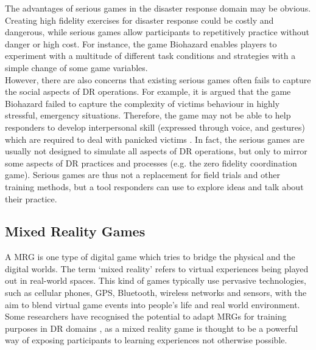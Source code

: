 The advantages of serious games in the disaster response domain may be obvious. Creating high fidelity exercises for disaster response could be costly and dangerous, while serious games allow participants to repetitively practice without danger or high cost. For instance, the game Biohazard \citep{Susi2007} enables players to experiment with a multitude of different task conditions and strategies with a simple change of some game variables.\\

However, there are also concerns that existing serious games often fails to capture the social aspects of \ac{DR} operations. For example, it is argued that the game Biohazard failed to capture the complexity of victims behaviour in highly stressful, emergency situations. Therefore, the game may not be able to help responders to develop interpersonal skill (expressed through voice, and gestures) which are required to deal with panicked victims \citep{Susi2007}. In fact, the serious games are usually not designed to simulate all aspects of \ac{DR} operations, but only to mirror some aspects of \ac{DR} practices and processes (e.g. the zero fidelity coordination game). Serious games are thus not a replacement for field trials and other training methods, but a tool responders can use to explore ideas and talk about their practice.\\


\subsection{Mixed Reality Games}
A \acf{MRG} is one type of digital game which tries to bridge the physical and the digital \citep{Benford2005} worlds. The term `mixed reality' refers to virtual experiences being played out in real-world spaces. This kind of games typically use pervasive technologies, such as cellular phones, GPS, Bluetooth, wireless networks and sensors, with the aim to blend virtual game events into people's life and real world environment. Some researchers have recognised the potential to adapt \ac{MRG}s for training purposes in \ac{DR} domains \citep{Fischer2012}, as a mixed reality game is thought to be a powerful way of exposing participants to learning experiences not otherwise possible. \\


